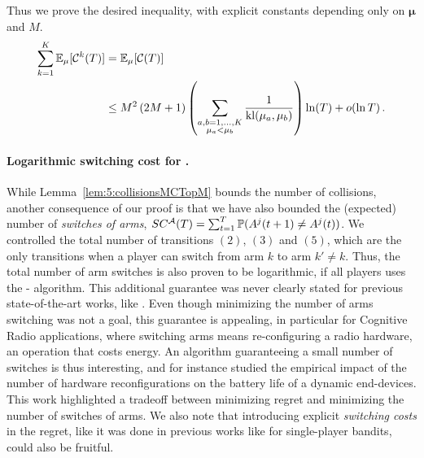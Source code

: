 \begin{smallproof}
  Thus we prove the desired inequality, with explicit constants depending only on $\boldsymbol{\mu}$ and $M$.
  \begin{align}
    \sum_{k=1}^K \mathbb{E}_{\mu}[\mathcal{C}^k(T)] & = \mathbb{E}_{\mu}[\mathcal{C}(T)] \nonumber\\
    & \leq M^2\left(2 M + 1\right) \left(\sum_{\substack{a,b=1,\dots,K\\\mu_a < \mu_b}} \frac{1}{\mathrm{kl}(\mu_a,\mu_b)}\right) \ln(T) + \mathop{}\mathopen{}o\mathopen{}\left(\ln T\right).
  \end{align}
\end{smallproof}


\paragraph{Logarithmic switching cost for \MCTopM.}\label{app:5:NumberSwitches}
%
While Lemma~\ref{lem:5:collisionsMCTopM} bounds the number of collisions,
another consequence of our proof is that we have also bounded
the (expected) number of \emph{switches of arms}, $SC^{\mathcal{A}}(T) = \sum_{t=1}^T \mathbb{P}(A^j(t+1) \neq A^j(t))$.
%
We controlled the total number of transitions $(2)$, $(3)$ and $(5)$,
which are the only transitions when a player can switch from arm $k$ to arm $k'\neq k$.
Thus, the total number of arm switches is also proven to be logarithmic, if all players uses the \MCTopM-\klUCB{} algorithm.
This additional guarantee was never clearly stated for previous state-of-the-art works, like \rhoRand.
%
Even though minimizing the number of arms switching was not a goal,
this guarantee is appealing, in particular for Cognitive Radio applications,
where switching arms means re-configuring a radio hardware, an operation that costs energy.
An algorithm guaranteeing a small number of switches is thus interesting,
and for instance \cite{modiDemo2016} studied the empirical impact of the number of hardware reconfigurations on the battery life of a dynamic end-devices.
This work highlighted a tradeoff between minimizing regret and minimizing the number of switches of arms.
%
We also note that introducing explicit \emph{switching costs} in the regret, like it was done in previous works like \cite{Koren17} for single-player bandits, could also be fruitful.


